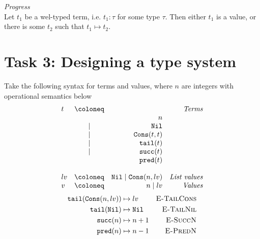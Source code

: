 \begin{theorem}\emph{Progress}\\
  Let $t_1$ be a wel-typed term, i.e. $t_1:\tau$ for some type $\tau$. 
  Then either $t_1$ is a value, or there is some $t_2$ such that $t_1\mapsto t_2$.
\end{theorem}

\section*{Task 3: Designing a type system}
Take the following syntax for terms and values, where $n$ are integers with operational semantics below
\[
  \begin{array}{lcrr}
    t & \coloneq & &\emph{Terms}\\
      &          & n \\
      &\mid      & \mathtt{Nil} \\
      &\mid      & \mathtt{Cons}(t,t) \\
      &\mid      & \mathtt{tail}(t)\\
      &\mid      & \mathtt{succ}(t)\\
      &          & \mathtt{pred}(t)\\
      \\
    lv & \coloneq & \mathtt{Nil}\mid \mathtt{Cons}(n,lv) & \emph{List values}\\
    v & \coloneq & n\mid lv& \emph{Values}\\
  \end{array}
\]
\begin{align*}
  \mathtt{tail}(\mathtt{Cons}(n,lv)) & \mapsto lv & \textsc{E-TailCons}\\
  \mathtt{tail}(\mathtt{Nil}) & \mapsto \mathtt{Nil} & \textsc{E-TailNil}\\
  \mathtt{succ}(n) & \mapsto n+1 & \textsc{E-SuccN}\\
  \mathtt{pred}(n) & \mapsto n-1 & \textsc{E-PredN}\\ 
\end{align*}
